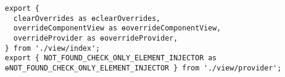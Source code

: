 \begin{verbatim}
export {
  clearOverrides as ɵclearOverrides,
  overrideComponentView as ɵoverrideComponentView,
  overrideProvider as ɵoverrideProvider,
} from './view/index';
export { NOT_FOUND_CHECK_ONLY_ELEMENT_INJECTOR as ɵNOT_FOUND_CHECK_ONLY_ELEMENT_INJECTOR } from './view/provider';
\end{verbatim}
